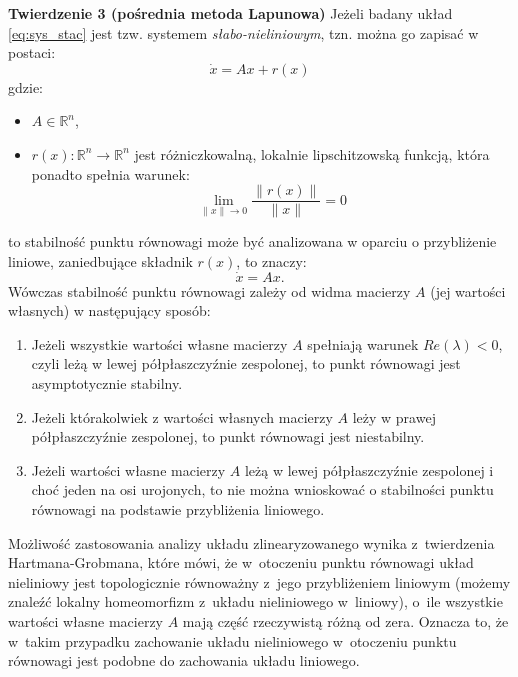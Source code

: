 \documentclass{article}
\begin{document}
\textbf{Twierdzenie 3 (pośrednia metoda Lapunowa)}
Jeżeli badany układ \ref{eq:sys_stac} jest tzw. systemem \textit{słabo-nieliniowym}, tzn. można go zapisać w postaci:
\begin{equation}\label{eq:sys_slabo_niel}
    \dot{x} = Ax + r(x)
\end{equation}
gdzie:
\begin{itemize}
    \item $A \in \mathbb{R}^{n}$,
    \item $r(x): \mathbb{R}^{n} \rightarrow \mathbb{R}^{n}$ jest różniczkowalną, lokalnie lipschitzowską funkcją, która ponadto spełnia warunek:
    \begin{equation}\label{eq:warunek_slabo_niel}
        \lim_{\lVert x \rVert \rightarrow 0} \frac{\lVert r(x) \rVert}{\lVert x \rVert} = 0
    \end{equation}
\end{itemize}
to stabilność punktu równowagi może być analizowana w oparciu o przybliżenie liniowe, zaniedbujące składnik $r(x)$, to znaczy:
$$  
    \dot{x} = Ax.
$$
Wówczas stabilność punktu równowagi zależy od widma macierzy $A$ (jej wartości własnych) w następujący sposób:
\begin{enumerate}
    \item Jeżeli wszystkie wartości własne macierzy $A$ spełniają warunek $Re(\lambda) < 0$, czyli leżą w lewej półpłaszczyźnie zespolonej,  to punkt równowagi jest asymptotycznie stabilny.
    \item Jeżeli którakolwiek z wartości własnych macierzy $A$ leży w prawej półpłaszczyźnie zespolonej, to punkt równowagi jest niestabilny.
    \item Jeżeli wartości własne macierzy $A$ leżą w lewej półpłaszczyźnie zespolonej i choć jeden na osi urojonych, to nie można wnioskować o stabilności punktu równowagi na podstawie przybliżenia liniowego.
\end{enumerate}

\begin{tcolorbox}[colback=orange!5, colframe=orange!75!black, title=Uwaga]
Możliwość zastosowania analizy układu zlinearyzowanego wynika z~twierdzenia
Hartmana-Grobmana, które mówi, że w~otoczeniu punktu równowagi układ nieliniowy
jest topologicznie równoważny z~jego przybliżeniem liniowym (możemy znaleźć lokalny
homeomorfizm z~układu nieliniowego w~liniowy), o~ile wszystkie
wartości własne macierzy $A$ mają część rzeczywistą różną od zera.
Oznacza to, że w~takim przypadku zachowanie układu nieliniowego w~otoczeniu
punktu równowagi jest podobne do zachowania układu liniowego. 
\end{tcolorbox}
\end{document}
